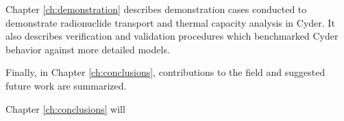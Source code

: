 
Chapter \ref{ch:demonstration} describes demonstration cases conducted to 
demonstrate radionuclide transport and thermal capacity analysis in Cyder. It 
also describes verification and validation procedures which benchmarked Cyder 
behavior against more detailed models.


Finally, in Chapter \ref{ch:conclusions}, contributions to the field and 
suggested future work are summarized. 


Chapter \ref{ch:conclusions} will 


% 

